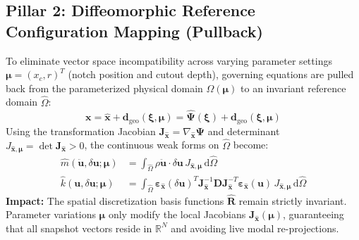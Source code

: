 \documentclass[11pt,a4paper]{article}
\newcommand{\vect}[1]{\mathbf{#1}}
\newcommand{\mat}[1]{\mathbf{#1}}
\begin{document}
\subsection{Pillar 2: Diffeomorphic Reference Configuration Mapping (Pullback)}
To eliminate vector space incompatibility across varying parameter settings $\boldsymbol{\mu} = (x_c, r)^T$ (notch position and cutout depth), governing equations are pulled back from the parameterized physical domain $\Omega(\boldsymbol{\mu})$ to an invariant reference domain $\hat{\Omega}$:
\begin{equation}
    \vect{x} = \hat{\vect{x}} + \vect{d}_{\text{geo}}(\boldsymbol{\xi}, \boldsymbol{\mu}) = \hat{\boldsymbol{\Psi}}(\boldsymbol{\xi}) + \vect{d}_{\text{geo}}(\boldsymbol{\xi}, \boldsymbol{\mu})
\end{equation}
Using the transformation Jacobian $\mathbf{J}_{\hat{\vect{x}}} = \nabla_{\hat{\vect{x}}} \boldsymbol{\Psi}$ and determinant $J_{\hat{\vect{x}}, \boldsymbol{\mu}} = \det \mathbf{J}_{\hat{\vect{x}}} > 0$, the continuous weak forms on $\hat{\Omega}$ become:
\begin{align}
    \hat{m}(\ddot{\vect{u}}, \delta\vect{u}; \boldsymbol{\mu}) &= \int_{\hat{\Omega}} \rho \ddot{\vect{u}} \cdot \delta\vect{u} \, J_{\hat{\vect{x}}, \boldsymbol{\mu}} \, \mathrm{d}\hat{\Omega} \\
    \hat{k}(\vect{u}, \delta\vect{u}; \boldsymbol{\mu}) &= \int_{\hat{\Omega}} \boldsymbol{\varepsilon}_{\hat{\vect{x}}}(\delta\vect{u})^T \mathbf{J}_{\hat{\vect{x}}}^{-1} \mat{D} \mathbf{J}_{\hat{\vect{x}}}^{-T} \boldsymbol{\varepsilon}_{\hat{\vect{x}}}(\vect{u}) \, J_{\hat{\vect{x}}, \boldsymbol{\mu}} \, \mathrm{d}\hat{\Omega}
\end{align}
\textbf{Impact:} The spatial discretization basis functions $\hat{\mat{R}}$ remain strictly invariant. Parameter variations $\boldsymbol{\mu}$ only modify the local Jacobians $\mathbf{J}_{\hat{\vect{x}}}(\boldsymbol{\mu})$, guaranteeing that all snapshot vectors reside in $\mathbb{R}^N$ and avoiding live modal re-projections.
\end{document}
